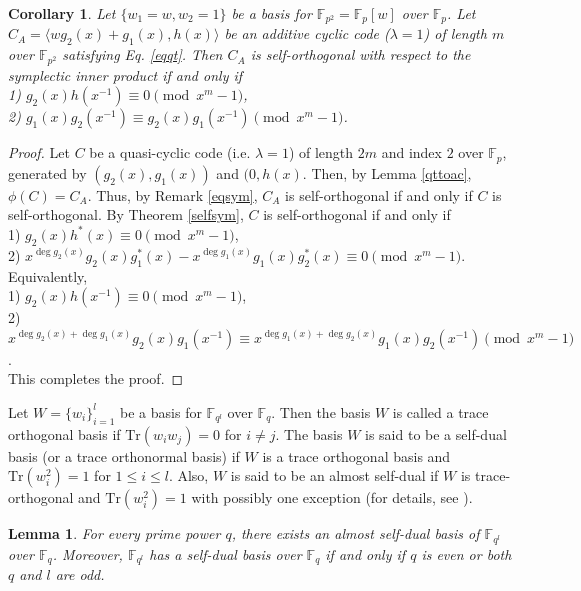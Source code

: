 \documentclass[12 pt]{extarticle}
\numberwithin{equation}{section}
\newtheorem{corollary}[theorem]{Corollary}
\newtheorem{lemma}[theorem]{Lemma}
\theoremstyle{definition}
\begin{document}
\begin{corollary}\cite[Theorem 4.2]{reza2025}
Let $\{w_1=w,w_2=1\}$ be a basis for $\mathbb{F}_{p^2}=\mathbb{F}_p[w]$ over $\mathbb{F}_p$. Let $C_A=\langle wg_2(x)+g_1(x),h(x)\rangle$ be an additive cyclic code ($\lambda=1$) of length $m$ over $\mathbb{F}_{p^2}$ satisfying Eq. \ref{eqqt}. Then $C_A$ is self-orthogonal with respect to the symplectic inner product if and only if  \\
1) $g_{2}(x)h(x^{-1})\equiv 0\pmod{x^m-1}$,\\
   2)  $ g_{1}(x)g_{2}(x^{-1}) \equiv g_{2}(x)g_{1}(x^{-1})  \pmod{x^m-1}$.
\end{corollary}
\begin{proof}
  Let $C$ be a quasi-cyclic code (i.e. $\lambda=1$) of length $2m$ and index $2$ over $\mathbb{F}_p$, generated by $(g_2(x),g_1(x))$ and $(0,h(x)$. Then, by Lemma \ref{qttoac}, $\phi(C)=C_A$. Thus, by Remark \ref{eqsym}, $C_A$ is self-orthogonal if and only if $C$ is self-orthogonal. 
    By Theorem \ref{selfsym}, $C$ is self-orthogonal if and only if \\
    1) $g_{2}(x)h^*(x)\equiv 0\pmod{x^m-1}$,\\
   2)  $x^{\deg g_2(x)} g_2(x)g_{1}^*(x)-x^{\deg g_{1}(x)}g_{1}(x)g_{2}^*(x)\equiv 0\pmod{x^m-1}$.\\
  Equivalently,\\
   1) $g_{2}(x)h(x^{-1})\equiv 0\pmod{x^m-1}$,\\
   2)  $x^{\deg g_2(x)+\deg g_1(x)} g_2(x)g_{1}(x^{-1})\equiv x^{\deg g_{1}(x)+\deg g_2(x)}g_{1}(x)g_{2}(x^{-1})\pmod{x^m-1}$.\\
   This completes the proof. 
\end{proof}



Let $W=\{w_i\}_{i=1}^l$ be a basis for $\mathbb{F}_{q^l}$ over $\mathbb{F}_q$. Then the basis $W$ is called a trace orthogonal basis if $\text{Tr}(w_iw_j)=0$ for $i\neq j$. The basis $W$  is said to be a self-dual basis (or a trace orthonormal basis) if $W$ is a trace orthogonal basis and $\text{Tr}(w_i^2)=1$ for $1\leq i\leq l$. Also, $W$  is said to be an almost self-dual if $W$ is trace-orthogonal and $\text{Tr}(w_i^2)=1$ with possibly one exception (for details, see \cite{seroussi1980,jungickle1990}).  

\begin{lemma}\cite{jungickle1990,seroussi1980} \label{tebasis}   For every prime power $q$, there exists an almost self-dual basis of $\mathbb{F}_{q^l}$ over $\mathbb{F}_q$. Moreover, $\mathbb{F}_{q^l}$ has a self-dual basis over $\mathbb{F}_q$ if and only if $q$ is even or  both $q$ and $l$  are odd.  
\end{lemma}
\end{document}
